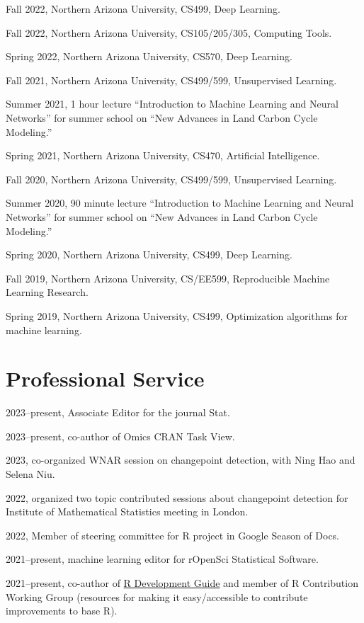 \documentclass[margin,line]{res}
\begin{document}
\begin{resume}
Fall 2022, Northern Arizona University, CS499, Deep Learning.

Fall 2022, Northern Arizona University, CS105/205/305, Computing Tools.

Spring 2022, Northern Arizona University, CS570, Deep Learning.

Fall 2021, Northern Arizona University, CS499/599, Unsupervised Learning.

Summer 2021, 1 hour lecture ``Introduction to Machine Learning and
Neural Networks'' for summer school on ``New Advances in Land Carbon
Cycle Modeling.''

Spring 2021, Northern Arizona University, CS470, Artificial Intelligence.

Fall 2020, Northern Arizona University, CS499/599, Unsupervised
Learning.

Summer 2020, 90 minute lecture ``Introduction to Machine Learning and
Neural Networks'' for summer school on ``New Advances in Land Carbon
Cycle Modeling.''

Spring 2020, Northern Arizona University, CS499, Deep Learning.

Fall 2019, Northern Arizona University, CS/EE599, Reproducible Machine
Learning Research.

Spring 2019, Northern Arizona University, CS499, Optimization
algorithms for machine learning.

\section{\sc Professional Service}

2023--present, Associate Editor for the journal Stat.

2023--present, co-author of Omics CRAN Task View.

2023, co-organized WNAR session on changepoint detection, with Ning
Hao and Selena Niu.

2022, organized two topic contributed sessions about changepoint
detection for Institute of Mathematical Statistics meeting in London.

2022, Member of steering committee for R project in Google Season of Docs.

2021--present, machine learning editor for rOpenSci Statistical Software.

2021--present, co-author of
\href{https://contributor.r-project.org/rdevguide/}{R Development
  Guide} and member of R Contribution Working Group (resources for
making it easy/accessible to contribute improvements to base R).


\end{resume}
\end{document}
